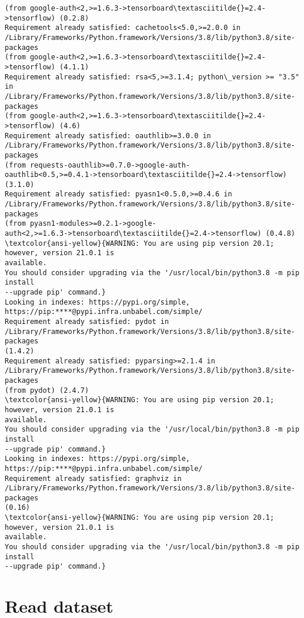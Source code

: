 \documentclass[11pt]{article}
\begin{document}
\begin{Verbatim}[commandchars=\\\{\}]
(from google-auth<2,>=1.6.3->tensorboard\textasciitilde{}=2.4->tensorflow) (0.2.8)
Requirement already satisfied: cachetools<5.0,>=2.0.0 in
/Library/Frameworks/Python.framework/Versions/3.8/lib/python3.8/site-packages
(from google-auth<2,>=1.6.3->tensorboard\textasciitilde{}=2.4->tensorflow) (4.1.1)
Requirement already satisfied: rsa<5,>=3.1.4; python\_version >= "3.5" in
/Library/Frameworks/Python.framework/Versions/3.8/lib/python3.8/site-packages
(from google-auth<2,>=1.6.3->tensorboard\textasciitilde{}=2.4->tensorflow) (4.6)
Requirement already satisfied: oauthlib>=3.0.0 in
/Library/Frameworks/Python.framework/Versions/3.8/lib/python3.8/site-packages
(from requests-oauthlib>=0.7.0->google-auth-
oauthlib<0.5,>=0.4.1->tensorboard\textasciitilde{}=2.4->tensorflow) (3.1.0)
Requirement already satisfied: pyasn1<0.5.0,>=0.4.6 in
/Library/Frameworks/Python.framework/Versions/3.8/lib/python3.8/site-packages
(from pyasn1-modules>=0.2.1->google-
auth<2,>=1.6.3->tensorboard\textasciitilde{}=2.4->tensorflow) (0.4.8)
\textcolor{ansi-yellow}{WARNING: You are using pip version 20.1; however, version 21.0.1 is
available.
You should consider upgrading via the '/usr/local/bin/python3.8 -m pip install
--upgrade pip' command.}
Looking in indexes: https://pypi.org/simple,
https://pip:****@pypi.infra.unbabel.com/simple/
Requirement already satisfied: pydot in
/Library/Frameworks/Python.framework/Versions/3.8/lib/python3.8/site-packages
(1.4.2)
Requirement already satisfied: pyparsing>=2.1.4 in
/Library/Frameworks/Python.framework/Versions/3.8/lib/python3.8/site-packages
(from pydot) (2.4.7)
\textcolor{ansi-yellow}{WARNING: You are using pip version 20.1; however, version 21.0.1 is
available.
You should consider upgrading via the '/usr/local/bin/python3.8 -m pip install
--upgrade pip' command.}
Looking in indexes: https://pypi.org/simple,
https://pip:****@pypi.infra.unbabel.com/simple/
Requirement already satisfied: graphviz in
/Library/Frameworks/Python.framework/Versions/3.8/lib/python3.8/site-packages
(0.16)
\textcolor{ansi-yellow}{WARNING: You are using pip version 20.1; however, version 21.0.1 is
available.
You should consider upgrading via the '/usr/local/bin/python3.8 -m pip install
--upgrade pip' command.}
    \end{Verbatim}

    \hypertarget{read-dataset}{%
\section{Read dataset}\label{read-dataset}}
\end{document}
